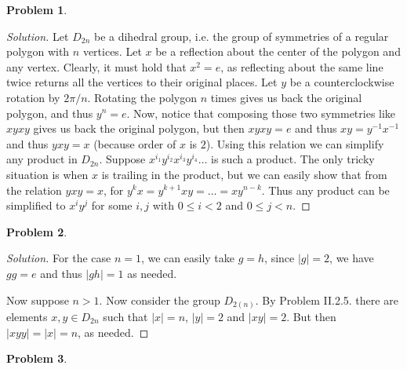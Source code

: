 \documentclass{article}
\theoremstyle{definition}
\newtheorem{problem-internal}{Problem}[subsection]
\newenvironment{problem}{
	\medskip
	\begin{problem-internal}
	}{
\end{problem-internal}
}
\newenvironment{solution}{
	\begin{proof}[Solution]
		\vspace{-8px}
		\setlength{\parskip}{4px}
		\setlength{\parindent}{0px}
	}{
\end{proof}
}
\newcommand{\abs}[1]{\left|#1\right|}
\begin{document}
\begin{problem}
\end{problem}

\begin{solution}
	Let $D_{2n}$ be a dihedral group, i.e. the group of symmetries of a regular polygon with $n$ vertices. Let $x$ be a reflection about the center of the polygon and any vertex. Clearly, it must hold that $x^2 = e$, as reflecting about the same line twice returns all the vertices to their original places. Let $y$ be a counterclockwise rotation by $2\pi/n$. Rotating the polygon $n$ times gives us back the original polygon, and thus $y^n=e$.  Now, notice that composing those two symmetries like $xyxy$ gives us back the original polygon, but then $xyxy=e$ and thus $xy=y^{-1}x^{-1}$ and thus $yxy=x$ (because order of $x$ is $2$). Using this relation we can simplify any product in $D_{2n}$. Suppose $x^{i_1}y^{i_2}x^{i_3}y^{i_4}\dots$ is such a product. The only tricky situation is when $x$ is trailing in the product, but we can easily show that from the relation $yxy=x$, for $y^kx=y^{k+1}xy=\dots=xy^{n-k}$. Thus any product can be simplified to $x^iy^j$ for some $i,j$ with $0 \leq i <2$ and $0 \leq j < n$.
\end{solution}

\begin{problem}
\end{problem}

\begin{solution}
	For the case $n=1$, we can easily take $g=h$, since $\abs{g}=2$, we have $gg=e$ and thus $\abs{gh}=1$ as needed.
	
	Now suppose $n > 1$. Now consider the group $D_{2(n)}$. By Problem II.2.5. there are elements $x,y \in D_{2n}$ such that $\abs{x}=n$, $\abs{y}=2$ and $\abs{xy}=2$. But then $\abs{xyy}=\abs{x}=n$, as needed.
\end{solution}

\begin{problem}
\end{problem}
\end{document}
